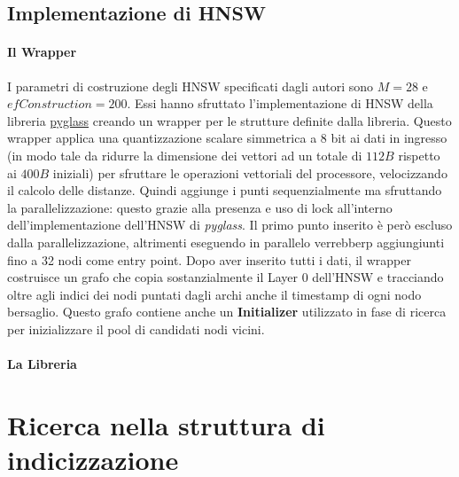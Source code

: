 \subsection{Implementazione di HNSW}

\paragraph{Il Wrapper}

I parametri di costruzione degli HNSW specificati dagli autori sono $M = 28$ e 
$efConstruction = 200$. Essi hanno sfruttato l'implementazione di HNSW della libreria 
\href{https://github.com/zilliztech/pyglass/tree/master}{pyglass} creando un wrapper per le strutture definite dalla libreria.
Questo wrapper applica una quantizzazione scalare simmetrica a $8$ bit ai dati in ingresso (in modo tale da ridurre la dimensione 
dei vettori ad un totale di $112 B$ rispetto ai $400 B$ iniziali) per sfruttare le operazioni vettoriali del processore, velocizzando il calcolo delle distanze.
Quindi aggiunge i punti sequenzialmente ma sfruttando la parallelizzazione: questo grazie alla presenza e uso di lock all'interno dell'implementazione dell'HNSW di \textit{pyglass}.
Il primo punto inserito \`e per\`o escluso dalla parallelizzazione, altrimenti eseguendo in parallelo verrebberp aggiungiunti fino a 32 nodi come entry point.
Dopo aver inserito tutti i dati, il wrapper costruisce un grafo che copia sostanzialmente il Layer 0 dell'HNSW e tracciando oltre agli indici dei nodi puntati dagli archi anche il timestamp di ogni nodo bersaglio. Questo grafo contiene anche un \textbf{Initializer} utilizzato in fase di ricerca per inizializzare il pool di candidati nodi vicini.

\paragraph{La Libreria}

\section{Ricerca nella struttura di indicizzazione}

